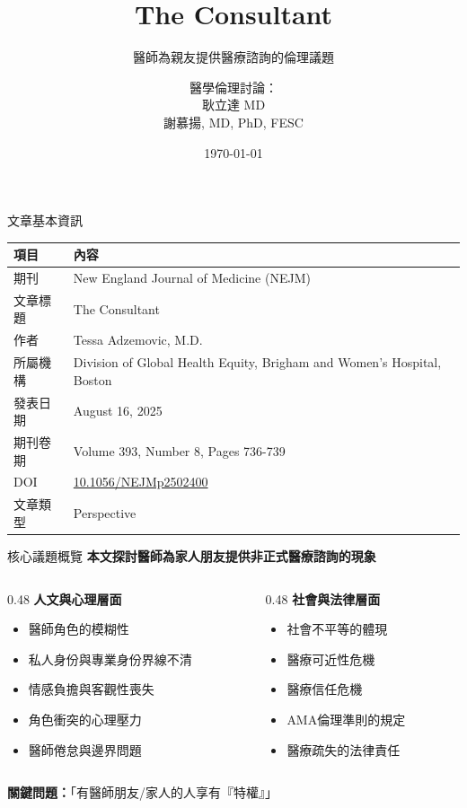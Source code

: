 \documentclass[aspectratio=169]{beamer}
\title{The Consultant}
\subtitle{醫師為親友提供醫療諮詢的倫理議題}
\author{醫學倫理討論：\\
耿立達 MD\\
謝慕揚, MD, PhD, FESC}
\date{\today}
\begin{document}
\begin{frame}
\titlepage
\end{frame}

\begin{frame}{文章基本資訊}
\begin{table}[h]
\centering
\small
\begin{tabular}{>{\raggedright\arraybackslash}p{3.5cm} >{\raggedright\arraybackslash}p{8cm}}
\toprule
\textbf{\textcolor{medred}{項目}} & \textbf{\textcolor{medred}{內容}} \\
\midrule
期刊 & New England Journal of Medicine (NEJM) \\
文章標題 & The Consultant \\
作者 & Tessa Adzemovic, M.D. \\
所屬機構 & Division of Global Health Equity, Brigham and Women's Hospital, Boston \\
發表日期 & August 16, 2025 \\
期刊卷期 & Volume 393, Number 8, Pages 736-739 \\
DOI & \href{https://www.nejm.org/doi/abs/10.1056/NEJMp2502400}{10.1056/NEJMp2502400} \\
文章類型 & Perspective \\
\bottomrule
\end{tabular}
\end{table}
\end{frame}

\begin{frame}{核心議題概覽}
\textbf{\textcolor{medred}{本文探討醫師為家人朋友提供非正式醫療諮詢的現象}}

\begin{columns}
\begin{column}{0.48\textwidth}
\textbf{\textcolor{medblue}{人文與心理層面}}
\begin{itemize}
\item 醫師角色的模糊性
\item 私人身份與專業身份界線不清
\item 情感負擔與客觀性喪失
\item 角色衝突的心理壓力
\item 醫師倦怠與邊界問題
\end{itemize}
\end{column}

\begin{column}{0.48\textwidth}
\textbf{\textcolor{medblue}{社會與法律層面}}
\begin{itemize}
\item 社會不平等的體現
\item 醫療可近性危機
\item 醫療信任危機
\item AMA倫理準則的規定
\item 醫療疏失的法律責任
\end{itemize}
\end{column}
\end{columns}

\vspace{0.5cm}
\textbf{\textcolor{medred}{關鍵問題：}}「有醫師朋友/家人的人享有『特權』」
\end{frame}
\end{document}
